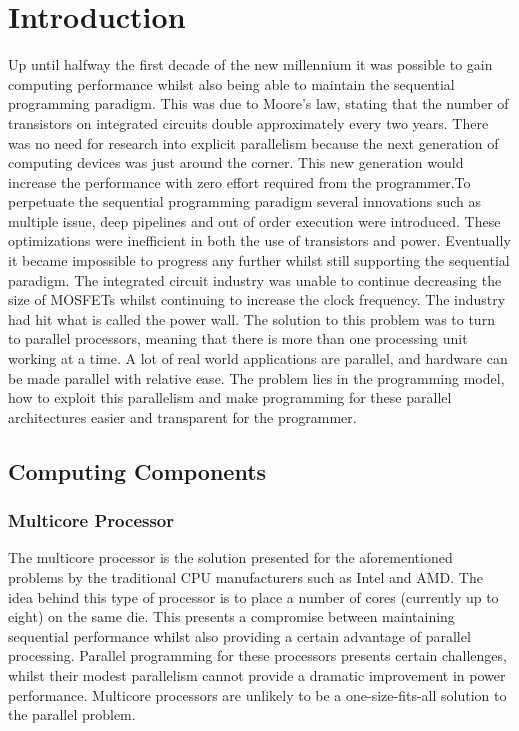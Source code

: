 



\chapter{Introduction} 
Up until halfway the first decade of the new millennium it was possible to gain computing performance whilst also being able to maintain the sequential programming paradigm. This was due to Moore's law, stating that the number of transistors on integrated circuits double approximately every two years. There was no need for research into explicit parallelism because the next generation of computing devices was just around the corner. This new generation would increase the performance with zero effort required from the programmer.To perpetuate the sequential programming paradigm several innovations such as multiple issue, deep pipelines and out of order execution were introduced. These optimizations  were inefficient in both the use of transistors and power. Eventually it became impossible to progress any further whilst still supporting the sequential paradigm. The integrated circuit industry was unable to continue decreasing the size of MOSFETs whilst continuing to increase the clock frequency. The industry had hit what is called the power wall.
The solution to this problem was to turn to parallel processors, meaning that there is more than one processing unit working at a time. A lot of real world applications are parallel, and hardware can be made parallel with relative ease. The problem lies in the programming model, how to exploit this parallelism and make programming for these parallel architectures easier and transparent for the programmer.



\section{Computing Components}

\subsection{Multicore Processor}
The multicore processor is the solution presented for the aforementioned problems by the traditional CPU manufacturers such as Intel and AMD. The idea behind this type of processor is to place a number of cores (currently up to eight) on the same die. This presents a compromise between maintaining sequential performance whilst also providing a certain advantage of parallel processing. Parallel programming for these processors presents certain challenges, whilst their modest parallelism cannot provide a dramatic improvement in power performance. Multicore processors are unlikely to be a one-size-fits-all solution to the parallel problem.\cite{asanovic_landscape_????}


